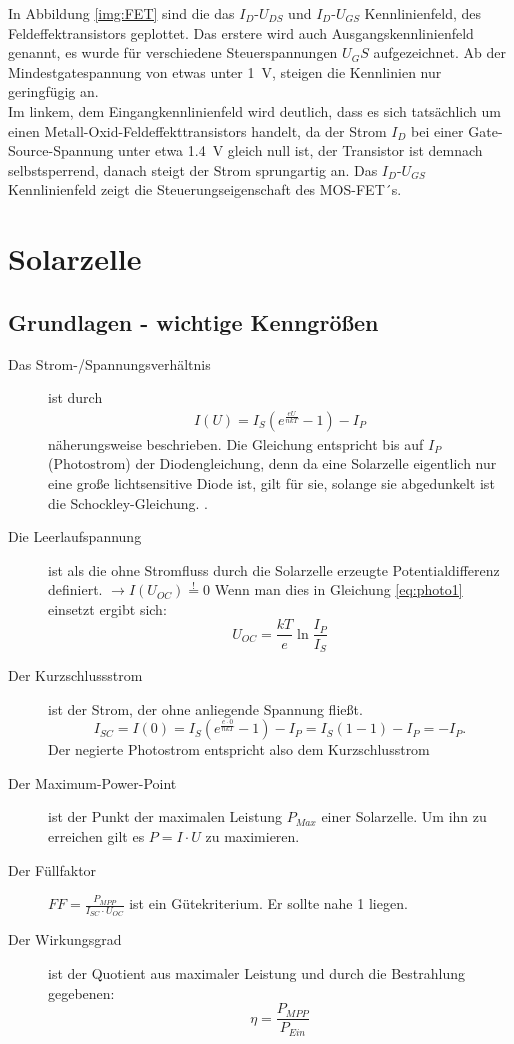 \documentclass[12pt,a4paper,ngerman]{report}
\begin{document}
	In Abbildung \ref{img:FET} sind die das $I_D$-$U_{DS}$ und $I_D$-$U_{GS}$ Kennlinienfeld, des Feldeffektransistors geplottet. Das erstere wird auch Ausgangskennlinienfeld genannt, es wurde für verschiedene Steuerspannungen $U_GS$ aufgezeichnet. Ab der Mindestgatespannung von etwas unter \SI{1}{\volt}, steigen die Kennlinien nur geringfügig an.\\
	Im linkem, dem Eingangkennlinienfeld wird deutlich, dass es sich tatsächlich um einen  Metall-Oxid-Feldeffekttransistors handelt, da der Strom $I_D$ bei einer Gate-Source-Spannung unter etwa \SI{1.4}{\volt} gleich null ist, der Transistor ist demnach selbstsperrend, danach steigt der Strom sprungartig an. Das $I_D$-$U_{GS}$ Kennlinienfeld zeigt die Steuerungseigenschaft des MOS-FET´s.
	\section{Solarzelle}
		
		\subsection*{Grundlagen - wichtige Kenngrößen}
		\begin{description}
		\item[Das Strom-/Spannungsverhältnis] ist durch 
		\begin{eqnarray}\label{eq:photo1}
			I(U)=I_S\left( e^{\frac{eU}{nkT}} -1 \right) - I_P
		\end{eqnarray}
		näherungsweise beschrieben. Die Gleichung entspricht bis auf $I_P$ (Photostrom) der Diodengleichung, denn da eine Solarzelle eigentlich nur eine große lichtsensitive Diode ist, gilt für sie, solange sie abgedunkelt ist die Schockley-Gleichung.
		.
		\item[Die Leerlaufspannung] ist als die ohne Stromfluss durch die Solarzelle erzeugte Potentialdifferenz definiert. $\rightarrow I(U_{OC})\stackrel{!}{=}0$ Wenn man dies in Gleichung \ref{eq:photo1} einsetzt ergibt sich:
		$$U_{OC}=\frac{kT}{e}\ln\frac{I_P}{I_S}$$
		\item[Der Kurzschlussstrom] ist der Strom, der ohne anliegende Spannung fließt.
		$$I_{SC}=I(0)=I_S\left( e^{\frac{e\cdot0}{nkT}} -1 \right) - I_P=I_S\left(1-1 \right) - I_P=-I_P.$$
		Der negierte Photostrom entspricht also dem Kurzschlusstrom
		\item[Der Maximum-Power-Point] ist der Punkt der maximalen Leistung $P_{Max}$ einer Solarzelle. Um ihn zu erreichen gilt es $P=I\cdot U$ zu maximieren.
		\item[Der Füllfaktor] $FF=\frac{P_{MPP}}{I_{SC}\cdot U_{OC}}$ ist ein Gütekriterium. Er sollte nahe 1 liegen.
		\item[Der Wirkungsgrad] ist der Quotient aus maximaler Leistung und durch die Bestrahlung gegebenen:$$\eta=\frac{P_{MPP}}{P_{Ein}}$$
		\end{description}
\end{document}
